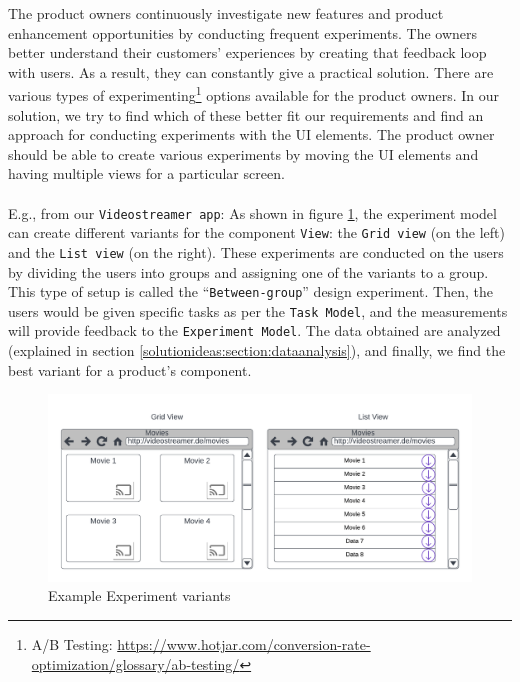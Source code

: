The product owners continuously investigate new features and product enhancement opportunities by conducting frequent experiments. 
The owners better understand their customers' experiences by creating that feedback loop with users. 
As a result, they can constantly give a practical solution. 
There are various types of experimenting\footnote{A/B Testing: \url{https://www.hotjar.com/conversion-rate-optimization/glossary/ab-testing/}} options available for the product owners.
In our solution, we try to find which of these better fit our requirements and find an approach for conducting experiments with the UI elements. 
The product owner should be able to create various experiments by moving the UI elements and having multiple views for a particular screen. \\ \\
E.g., from our \texttt{Videostreamer app}: As shown in figure \ref{solutionideas:fig:experimentingvariants}, the experiment model can create different variants for the component \texttt{View}: the \texttt{Grid view} (on the left) and the \texttt{List view} (on the right). 
These experiments are conducted on the users by dividing the users into groups and assigning one of the variants to a group. 
This type of setup is called the ``\texttt{Between-group}'' design experiment. 
Then, the users would be given specific tasks as per the \texttt{Task Model}, and the measurements will provide feedback to the \texttt{Experiment Model}. 
The data obtained are analyzed (explained in section \ref{solutionideas:section:dataanalysis}), and finally, we find the best variant for a product's component. 

\begin{figure}[ht]
	\centering
  \includegraphics[width=1.0\textwidth]{images/solution-ideas/Experimentvariants.png}
	\caption{Example Experiment variants}
	\label{solutionideas:fig:experimentingvariants}
\end{figure}

